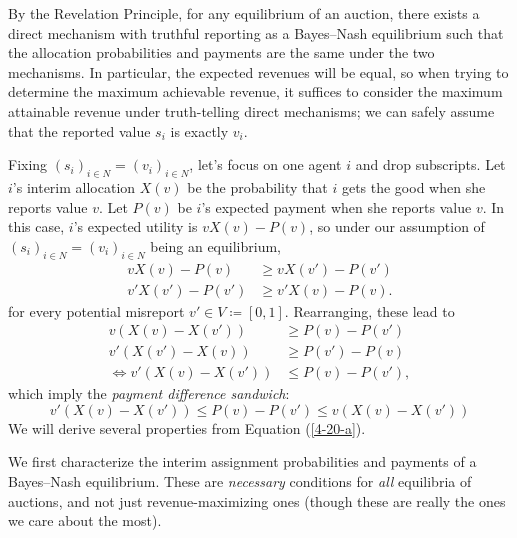 By the Revelation Principle, for any equilibrium of an auction, there exists a direct mechanism with truthful reporting as a Bayes--Nash equilibrium such that the allocation probabilities and payments are the same under the two mechanisms.
In particular, the expected revenues will be equal, so when trying to determine the maximum achievable revenue, it suffices to consider the maximum attainable revenue under truth-telling direct mechanisms; we can safely assume that the reported value $s_i$ is exactly $v_i$.

Fixing $\left( s_i \right)_{i \in N} = \left( v_i \right)_{i \in N}$, let's focus on one agent $i$ and drop subscripts.
Let $i$'s interim allocation $X(v)$ be the probability that $i$ gets the good when she reports value $v$. Let $P(v)$ be $i$'s expected payment when she reports value $v$.
In this case, $i$'s expected utility is $vX(v) - P(v)$, so under our assumption of $\left( s_i \right)_{i \in N} = \left( v_i \right)_{i \in N}$ being an equilibrium,
\begin{align*}
	vX(v) - P(v) &\ge vX(v') - P(v') \\
	v'X(v') - P(v') &\ge v' X(v) - P(v)
.\end{align*}
for every potential misreport $v' \in V \coloneqq [0,1]$.
Rearranging, these lead to 
\begin{align*}
	v\left( X(v) - X(v') \right) &\ge P(v) - P(v') \\
	v'\left( X(v') - X(v) \right) &\ge P(v') - P(v) \\
	\iff v'\left( X(v) - X(v') \right) &\le P(v) - P(v')
,\end{align*}
which imply the \emph{payment difference sandwich}:
\begin{equation}
	v'(X(v) - X(v')) \le P(v) - P(v') \le v\left( X(v) - X(v') \right) \label{4-20-a}
\end{equation}
We will derive several properties from Equation (\ref{4-20-a}).

We first characterize the interim assignment probabilities and payments of a Bayes--Nash equilibrium.  These are \emph{necessary} conditions for \emph{all} equilibria of auctions, and not just revenue-maximizing ones (though these are really the ones we care about the most).

